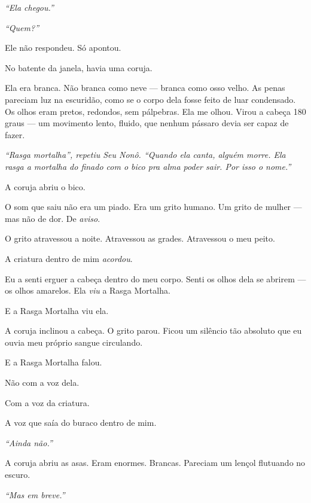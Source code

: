 \noindent \textit{\textquotedblleft{}Ela chegou.\textquotedblright{}}

\noindent \textit{\textquotedblleft{}Quem?\textquotedblright{}}

\noindent Ele não respondeu. Só apontou.

\noindent No batente da janela, havia uma coruja.

\noindent Ela era branca. Não branca como neve --- branca como osso velho. As penas pareciam luz na escuridão, como se o corpo dela fosse feito de luar condensado. Os olhos eram pretos, redondos, sem pálpebras. Ela me olhou. Virou a cabeça 180 graus --- um movimento lento, fluido, que nenhum pássaro devia ser capaz de fazer.

\noindent \textit{\textquotedblleft{}Rasga mortalha\textquotedblright{}\textit{, repetiu Seu Nonô. }\textquotedblleft{}Quando ela canta, alguém morre. Ela rasga a mortalha do finado com o bico pra alma poder sair. Por isso o nome.\textquotedblright{}}

\noindent A coruja abriu o bico.

\noindent O som que saiu não era um piado.
Era um grito humano.
Um grito de mulher --- mas não de dor.
De \textit{aviso}.

\noindent O grito atravessou a noite. Atravessou as grades. Atravessou o meu peito.

\noindent A criatura dentro de mim \textit{acordou}.

\noindent Eu a senti erguer a cabeça dentro do meu corpo. Senti os olhos dela se abrirem --- os olhos amarelos. Ela \textit{viu} a Rasga Mortalha.

\noindent E a Rasga Mortalha viu ela.

\noindent A coruja inclinou a cabeça. O grito parou. Ficou um silêncio tão absoluto que eu ouvia meu próprio sangue circulando.

\noindent E a Rasga Mortalha falou.

\noindent Não com a voz dela.

\noindent Com a voz da criatura.

\noindent A voz que saía do buraco dentro de mim.

\noindent \textit{\textquotedblleft{}Ainda não.\textquotedblright{}}

\noindent A coruja abriu as asas. Eram enormes. Brancas. Pareciam um lençol flutuando no escuro.

\noindent \textit{\textquotedblleft{}Mas em breve.\textquotedblright{}}

